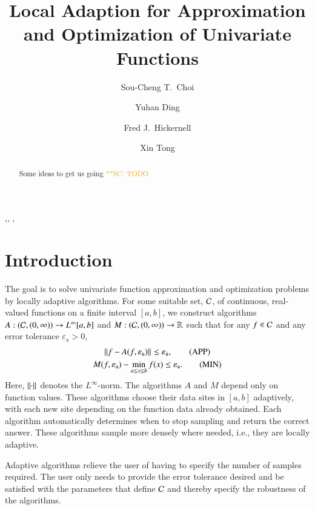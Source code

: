 \documentclass[review]{elsarticle}
\newcommand{\abstol}{\varepsilon_{\textrm{a}}}
\theoremstyle{definition}
\newcommand{\scnote}[1]{ {\textcolor{orange}  {\mbox{**SC:} #1}}}
\begin{document}
\begin{frontmatter}

\title{Local Adaption for Approximation and Optimization of Univariate Functions}


\author{Sou-Cheng T.~Choi}
\author{Yuhan Ding}
\author{Fred J.~Hickernell}
\author{Xin Tong}
\address{Department of Applied Mathematics, Illinois Institute of Technology, RE 208, 10 West 32$^{\text{nd}}$ Street, Chicago, Illinois, 60616, USA}

\begin{abstract}
Some ideas to get us going \scnote{TODO}
\end{abstract}

\begin{keyword}
\sep \sep
\MSC[2010]  \sep
\end{keyword}

\end{frontmatter}

\section{Introduction} \label{sec:intro}

The goal is to solve univariate function approximation and optimization problems by locally adaptive algorithms. For some suitable set, $\mathcal{C}$, of continuous,
real-valued functions on a finite interval $[a,b]$, we  construct
algorithms $A:(\mathcal{C},(0,\infty)) \to L^{\infty}[a,b]$ and $M: (\mathcal{C},(0,\infty)) \to
\mathbb{R}$ such that for any $f \in \mathcal{C}$ and any error tolerance $\abstol > 0$,
\begin{gather}
\norm{f - A(f,\abstol)} \le \abstol,  \tag{APP} \label{appxprob} \\
M(f,\abstol) - \min_{a \le x \le b} f(x)  \le \abstol. \tag{MIN} \label{optprob}
\end{gather}
Here, $\left \lVert \cdot \right \rVert_{{}}$ denotes the $L^{\infty}$-norm.  The algorithms $A$ and $M$ depend only on function values. These algorithms choose their data sites in $[a,b]$ adaptively, with each new site depending on the function data already obtained.  Each algorithm  automatically determines when to stop sampling
and return the correct answer.  These algorithms sample more densely where needed, i.e., they are locally adaptive.

Adaptive algorithms relieve the user of having to specify the number of samples required.  The user only needs to provide the error tolerance desired and be satisfied with the parameters that define $\mathcal{C}$ and thereby specify the robustness of the algorithms.
\end{document}

